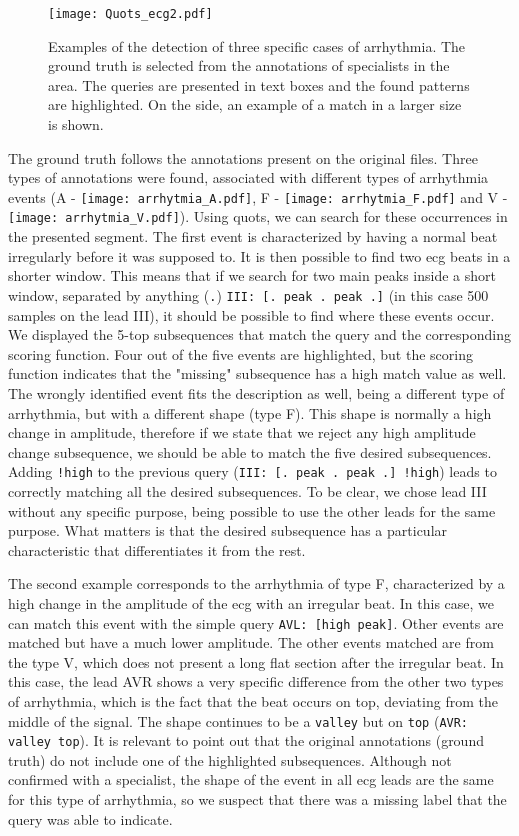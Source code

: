 \begin{figure}
\texttt{[image: Quots\_ecg2.pdf]}
\caption{Examples of the detection of three specific cases of arrhythmia. The ground truth is selected from the annotations of specialists in the area. The queries are presented in text boxes and the found patterns are highlighted. On the side, an example of a match in a larger size is shown.}
\label{fig:use_case2}
\end{figure}

The ground truth follows the annotations present on the original files. Three types of annotations were found, associated with different types of arrhythmia events (A - \texttt{[image: arrhytmia\_A.pdf]}, F - \texttt{[image: arrhytmia\_F.pdf]} and V - \texttt{[image: arrhytmia\_V.pdf]}). Using \gls{quots}, we can search for these occurrences in the presented segment. The first event is characterized by having a normal beat irregularly before it was supposed to. It is then possible to find two \gls{ecg} beats in a shorter window. This means that if we search for two main peaks inside a short window, separated by anything (\texttt{.}) \texttt{III: [. peak . peak .]} (in this case 500 samples on the lead III), it should be possible to find where these events occur. We displayed the 5-top subsequences that match the query and the corresponding scoring function. Four out of the five events are highlighted, but the scoring function indicates that the "missing" subsequence has a high match value as well. The wrongly identified event fits the description as well, being a different type of arrhythmia, but with a different shape (type F). This shape is normally a high change in amplitude, therefore if we state that we reject any high amplitude change subsequence, we should be able to match the five desired subsequences. Adding \texttt{!high} to the previous query (\texttt{III: [. peak . peak .] !high}) leads to correctly matching all the desired subsequences. To be clear, we chose lead III without any specific purpose, being possible to use the other leads for the same purpose. What matters is that the desired subsequence has a particular characteristic that differentiates it from the rest.
\par
The second example corresponds to the arrhythmia of type F, characterized by a high change in the amplitude of the \gls{ecg} with an irregular beat. In this case, we can match this event with the simple query \texttt{AVL: [high peak]}. Other events are matched but have a much lower amplitude. The other events matched are from the type V, which does not present a long flat section after the irregular beat. In this case, the lead AVR shows a very specific difference from the other two types of arrhythmia, which is the fact that the beat occurs on top, deviating from the middle of the signal. The shape continues to be a \texttt{valley} but on \texttt{top} (\texttt{AVR: valley top}). It is relevant to point out that the original annotations (ground truth) do not include one of the highlighted subsequences. Although not confirmed with a specialist, the shape of the event in all \gls{ecg} leads are the same for this type of arrhythmia, so we suspect that there was a missing label that the query was able to indicate.
